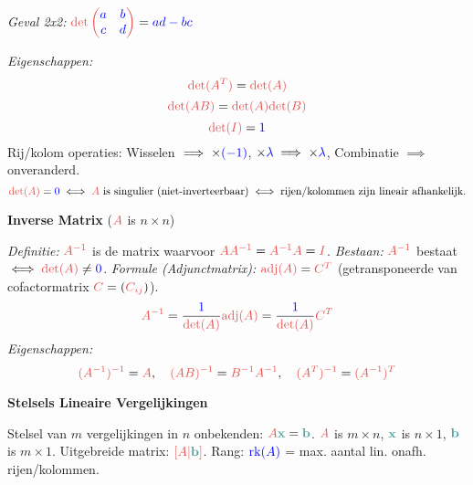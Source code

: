 \documentclass[12pt]{article}
\renewcommand{\vec}[1]{\textcolor{vectorTeal}{\mathbf{#1}}}
\newcommand{\scalar}[1]{\textcolor{scalarBrightBlue}{#1}}
\newcommand{\mat}[1]{\textcolor{matrixSoftRed}{#1}}
\DeclareMathOperator{\rk}{rk}
\begin{document}
\textit{Geval 2x2:} $\mat{\det \begin{pmatrix} \scalar{a} & \scalar{b} \\ \scalar{c} & \scalar{d} \end{pmatrix}} = \scalar{ad - bc}$

\textit{Eigenschappen:}
\[
\mat{\det(A^T)} = \mat{\det(A)}
\]
\[
\mat{\det(AB)} = \mat{\det(A)}\mat{\det(B)}
\]
\[
\mat{\det(I)} = \scalar{1}
\]
Rij/kolom operaties: Wisselen $\implies \times \scalar{(-1)}$, $\times \scalar{\lambda} \implies \times \scalar{\lambda}$, Combinatie $\implies$ onveranderd.
\[
\mat{\det(A)} = \scalar{0} \iff \mat{A} \text{ is singulier (niet-inverteerbaar)} \iff \text{rijen/kolommen zijn lineair afhankelijk.}
\]

\vspace{1.5em} %
{\centering
\textcolor{headerBrown}{\large\textbf{Inverse Matrix}} ($\mat{A}$ is $n \times n$)
\par
}%
\textit{Definitie:} $\mat{A^{-1}}$ is de matrix waarvoor $\mat{A A^{-1}} = \mat{A^{-1} A} = \mat{I}$.
\textit{Bestaan:} $\mat{A^{-1}}$ bestaat $\iff \mat{\det(A)} \neq \scalar{0}$.
\textit{Formule (Adjunctmatrix):} $\mat{\text{adj}(A)} = \mat{C^T}$ (getransponeerde van cofactormatrix $\mat{C} = (\mat{C_{ij}})$).
\[
\mat{A^{-1}} = \frac{\scalar{1}}{\mat{\det(A)}} \mat{\text{adj}(A)} = \frac{\scalar{1}}{\mat{\det(A)}} \mat{C^T}
\]
\textit{Eigenschappen:}
\[
\mat{(A^{-1})^{-1}} = \mat{A}, \quad \mat{(AB)^{-1}} = \mat{B^{-1} A^{-1}}, \quad \mat{(A^T)^{-1}} = \mat{(A^{-1})^T}
\]

\vspace{1.5em} %
{\centering
\textcolor{headerBrown}{\large\textbf{Stelsels Lineaire Vergelijkingen}}
\par
}%
Stelsel van $m$ vergelijkingen in $n$ onbekenden: $\mat{A} \vec{x} = \vec{b}$. $\mat{A}$ is $m \times n$, $\vec{x}$ is $n \times 1$, $\vec{b}$ is $m \times 1$.
Uitgebreide matrix: $\mat{[A | \vec{b}]}$.
Rang: $\scalar{\rk(A)}$ = max. aantal lin. onafh. rijen/kolommen.
\end{document}
